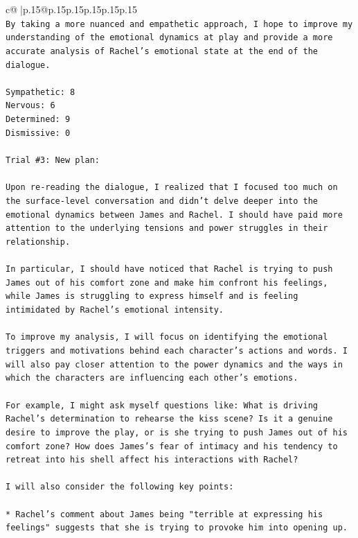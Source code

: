 \documentclass{article}
\begin{document}
{\begin{supertabular}{c@{$\;$}|p{.15\linewidth}@{}p{.15\linewidth}p{.15\linewidth}p{.15\linewidth}p{.15\linewidth}p{.15\linewidth}}
{{{\\ 
\texttt{By taking a more nuanced and empathetic approach, I hope to improve my understanding of the emotional dynamics at play and provide a more accurate analysis of Rachel's emotional state at the end of the dialogue.} \\
\\ 
\texttt{Sympathetic: 8} \\
\texttt{Nervous: 6} \\
\texttt{Determined: 9} \\
\texttt{Dismissive: 0} \\
\\ 
\texttt{Trial \#3: New plan: } \\
\\ 
\texttt{Upon re{-}reading the dialogue, I realized that I focused too much on the surface{-}level conversation and didn't delve deeper into the emotional dynamics between James and Rachel. I should have paid more attention to the underlying tensions and power struggles in their relationship. } \\
\\ 
\texttt{In particular, I should have noticed that Rachel is trying to push James out of his comfort zone and make him confront his feelings, while James is struggling to express himself and is feeling intimidated by Rachel's emotional intensity. } \\
\\ 
\texttt{To improve my analysis, I will focus on identifying the emotional triggers and motivations behind each character's actions and words. I will also pay closer attention to the power dynamics and the ways in which the characters are influencing each other's emotions. } \\
\\ 
\texttt{For example, I might ask myself questions like: What is driving Rachel's determination to rehearse the kiss scene? Is it a genuine desire to improve the play, or is she trying to push James out of his comfort zone? How does James's fear of intimacy and his tendency to retreat into his shell affect his interactions with Rachel? } \\
\\ 
\texttt{I will also consider the following key points:} \\
\\ 
\texttt{* Rachel's comment about James being "terrible at expressing his feelings" suggests that she is trying to provoke him into opening up.} \\
}}}
\end{supertabular}}
\end{document}
